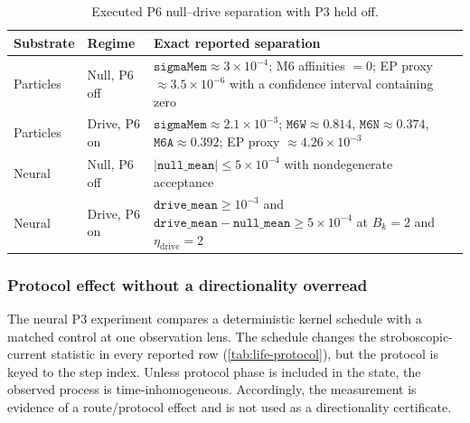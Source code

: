 \begin{table}[htbp]
\centering
\small
\begin{tabularx}{\textwidth}{@{}llX@{}}
\toprule
Substrate & Regime & Exact reported separation \\
\midrule
Particles & Null, P6 off &
$\texttt{sigmaMem}\approx3\times10^{-4}$; M6 affinities $=0$; EP proxy
$\approx3.5\times10^{-6}$ with a confidence interval containing zero \\
Particles & Drive, P6 on &
$\texttt{sigmaMem}\approx2.1\times10^{-3}$;
$\texttt{M6W}\approx0.814$,
$\texttt{M6N}\approx0.374$,
$\texttt{M6A}\approx0.392$; EP proxy $\approx4.26\times10^{-3}$ \\
Neural & Null, P6 off &
$|\texttt{null\_mean}|\le5\times10^{-4}$ with nondegenerate acceptance \\
Neural & Drive, P6 on &
$\texttt{drive\_mean}\ge10^{-3}$ and
$\texttt{drive\_mean}-\texttt{null\_mean}\ge5\times10^{-4}$ at
$B_k=2$ and $\eta_{\mathrm{drive}}=2$ \\
\bottomrule
\end{tabularx}
\caption{Executed P6 null--drive separation with P3 held off.}
\label{tab:life-drive}
\end{table}

\subsubsection{Protocol effect without a directionality overread}

The neural P3 experiment compares a deterministic kernel schedule with a
matched control at one observation lens.  The schedule changes the
stroboscopic-current statistic in every reported row
(\cref{tab:life-protocol}), but the protocol is keyed to the step index.
Unless protocol phase is included in the state, the observed process is
time-inhomogeneous.  Accordingly, the measurement is evidence of a
route/protocol effect and is not used as a directionality certificate.

